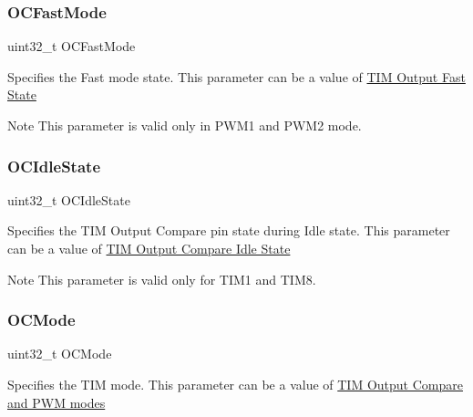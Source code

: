 \subsubsection{\texorpdfstring{O\+C\+Fast\+Mode}{OCFastMode}}
{\footnotesize\ttfamily uint32\+\_\+t O\+C\+Fast\+Mode}

Specifies the Fast mode state. This parameter can be a value of \hyperlink{group___t_i_m___output___fast___state}{T\+IM Output Fast State} \begin{DoxyNote}{Note}
This parameter is valid only in P\+W\+M1 and P\+W\+M2 mode. 
\end{DoxyNote}
\mbox{\label{struct_t_i_m___o_c___init_type_def_a57bb589da3cf2b39b727fe4a3d334ab3}} 
\subsubsection{\texorpdfstring{O\+C\+Idle\+State}{OCIdleState}}
{\footnotesize\ttfamily uint32\+\_\+t O\+C\+Idle\+State}

Specifies the T\+IM Output Compare pin state during Idle state. This parameter can be a value of \hyperlink{group___t_i_m___output___compare___idle___state}{T\+IM Output Compare Idle State} \begin{DoxyNote}{Note}
This parameter is valid only for T\+I\+M1 and T\+I\+M8. 
\end{DoxyNote}
\mbox{\label{struct_t_i_m___o_c___init_type_def_add4ac9143086c89effbede5c54e958bf}} 
\subsubsection{\texorpdfstring{O\+C\+Mode}{OCMode}}
{\footnotesize\ttfamily uint32\+\_\+t O\+C\+Mode}

Specifies the T\+IM mode. This parameter can be a value of \hyperlink{group___t_i_m___output___compare__and___p_w_m__modes}{T\+IM Output Compare and P\+WM modes} \mbox{\label{struct_t_i_m___o_c___init_type_def_a78d21970d78c1e3e328692743406ba25}} 
